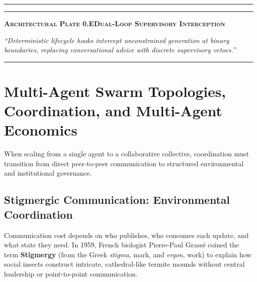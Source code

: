 \vspace{10pt}
\noindent\begin{minipage}{\linewidth}
  \centering
  \par\vspace{8pt}%
  {\color{pdcobalt}\rule{\linewidth}{1.2pt}}\par\vspace{5pt}%
  \raggedright
  {\color{pdswissred}\rule{4.5pt}{4.5pt}}\enspace%
  {\pdgrotesk\bfseries\scshape\fontsize{9}{11}\selectfont\color{hhink}%
    Architectural Plate 0.E\enspace\textperiodcentered\enspace Dual-Loop Supervisory Interception}\par\vspace{4pt}%
  {\pdgrotesk\itshape\fontsize{9.5}{13}\selectfont\color{hhink}%
    ``Deterministic lifecycle hooks intercept unconstrained generation at binary boundaries, replacing conversational advice with discrete supervisory vetoes.''}\par\vspace{6pt}%
  {\color{hhgray!30}\rule{\linewidth}{0.4pt}}
\end{minipage}
\vspace{10pt}

\section{Multi-Agent Swarm Topologies, Coordination, and Multi-Agent Economics}\label{sec:prereq-swarms}

When scaling from a single agent to a collaborative collective, coordination must transition from direct peer-to-peer communication to structured environmental and institutional governance.

\subsection{Stigmergic Communication: Environmental Coordination}

Communication cost depends on who publishes, who consumes each update, and what state they need. In 1959, French biologist Pierre-Paul Grass{\'e} coined the term \textbf{Stigmergy} (from the Greek \emph{stigma}, mark, and \emph{ergon}, work) to explain how social insects construct intricate, cathedral-like termite mounds without central leadership or point-to-point communication.

